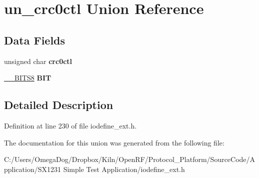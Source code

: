 \hypertarget{unionun__crc0ctl}{\section{un\-\_\-crc0ctl Union Reference}
\label{unionun__crc0ctl}
}
\subsection*{Data Fields}
\begin{DoxyCompactItemize}
\item 
\hypertarget{unionun__crc0ctl_ad77f9fc33947c1cfa399a17102544d57}{unsigned char {\bfseries crc0ctl}}\label{unionun__crc0ctl_ad77f9fc33947c1cfa399a17102544d57}

\item 
\hypertarget{unionun__crc0ctl_ad4601a16495cf1911622a91818a90f78}{\hyperlink{struct_____b_i_t_s8}{\-\_\-\-\_\-\-B\-I\-T\-S8} {\bfseries B\-I\-T}}\label{unionun__crc0ctl_ad4601a16495cf1911622a91818a90f78}

\end{DoxyCompactItemize}


\subsection{Detailed Description}


Definition at line 230 of file iodefine\-\_\-ext.\-h.



The documentation for this union was generated from the following file\-:\begin{DoxyCompactItemize}
\item 
C\-:/\-Users/\-Omega\-Dog/\-Dropbox/\-Kiln/\-Open\-R\-F/\-Protocol\-\_\-\-Platform/\-Source\-Code/\-Application/\-S\-X1231 Simple Test Application/iodefine\-\_\-ext.\-h\end{DoxyCompactItemize}
